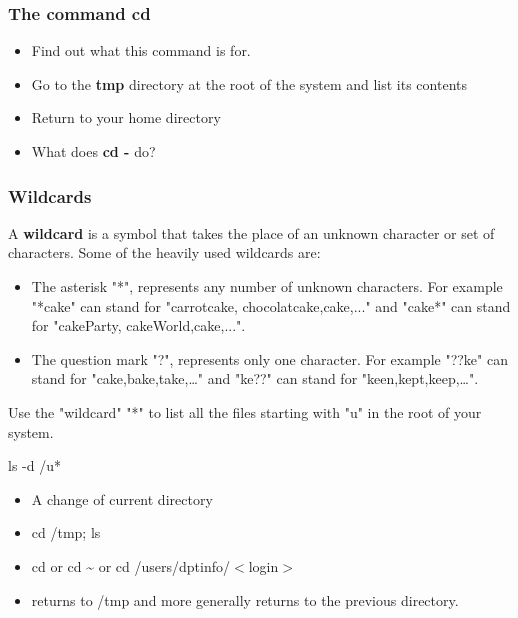 \documentclass[11pt]{article}
\begin{document}
\subsubsection{The command \textbf{cd}}

\begin{itemize}
\item Find out what this command is for.
\item Go to the \textbf{tmp} directory at the root of the system and list its contents
\item Return to your home directory
\item What does \textbf{cd -} do?
\end{itemize}


\subsubsection{Wildcards}
A {\bf wildcard} is a symbol that takes the place of an unknown character or set of characters. Some of the heavily used wildcards are:
\begin{itemize}
	\item The asterisk "*", represents any number of unknown characters. For example "*cake" can stand for "carrotcake, chocolatcake,cake,..." and "cake*" can stand for "cakeParty, cakeWorld,cake,...".
	\item The question mark "?", represents only one character. For example "??ke" can stand for "cake,bake,take,\ldots" and "ke??" can stand for "keen,kept,keep,\ldots". 
\end{itemize}
\smallskip

Use the "wildcard" "*" to list all the files starting with "u" in the root of your system.

\begin{solution}
	ls -d /u*
\end{solution}


\begin{solution}
 \begin{itemize}
\item A change of current directory
\item cd /tmp; ls
\item cd or cd \textasciitilde{} or cd /users/dptinfo/$<$login$>$
\item returns to /tmp and more generally returns to the previous directory.
 \end{itemize}
\end{solution}
\end{document}
